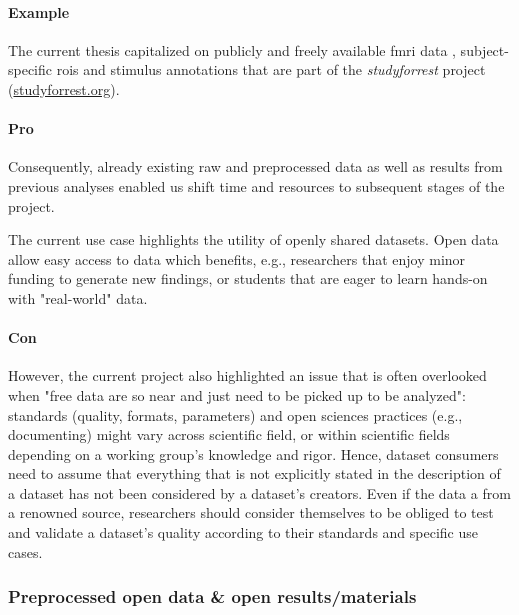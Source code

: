 \paragraph{Example}

The current thesis capitalized on publicly and freely available
%
\ac{fmri} data \citep{hanke2014audiomovie, hanke2016simultaneous,
sengupta2016extension},
%
subject-specific \acp{roi} \citep{sengupta2016extension} and
%
stimulus annotations \citep{haeusler2016cutanno}
%
that are part of the \textit{studyforrest} project
(\href{www.studyforrest.org}{\url{studyforrest.org}}).


\paragraph{Pro}

%
Consequently, already existing raw and preprocessed data as well as results from
previous analyses enabled us shift time and resources to subsequent stages of
the project.

%
The current use case highlights the utility of openly shared datasets.
%
Open data allow easy access to data which benefits, e.g., researchers that enjoy
minor funding to generate new findings, or students that are eager to learn
hands-on with "real-world" data.

\paragraph{Con}
%
However, the current project also highlighted an issue that is often overlooked
when "free data are so near and just need to be picked up to be analyzed":
%
standards (quality, formats, parameters) and open sciences practices (e.g.,
documenting) might vary across scientific field, or within scientific fields
depending on a working group's knowledge and rigor.
Hence, dataset consumers need to assume that everything that is not explicitly
stated in the description of a dataset has not been considered by a dataset's
creators.
Even if the data a from a renowned source, researchers should consider
themselves to be obliged to test and validate a dataset's quality according to
their standards and specific use cases.


\subsubsection{Preprocessed open data \& open results/materials}

